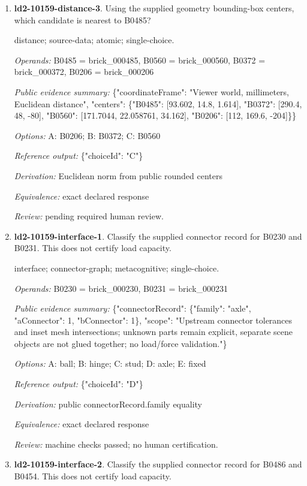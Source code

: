 \begin{enumerate}
\item \textbf{ld2-10159-distance-3}. Using the supplied geometry bounding-box centers, which candidate is nearest to B0485?
\par{\small distance; source-data; atomic; single-choice.\par\textit{Operands:} B0485 = brick\_000485, B0560 = brick\_000560, B0372 = brick\_000372, B0206 = brick\_000206\par\textit{Public evidence summary:} \{"coordinateFrame": "Viewer world, millimeters, Euclidean distance", "centers": \{"B0485": [93.602, 14.8, 1.614], "B0372": [290.4, 48, -80], "B0560": [171.7044, 22.058761, 34.162], "B0206": [112, 169.6, -204]\}\}\par\textit{Options:} A: B0206; B: B0372; C: B0560\par\textit{Reference output:} \{"choiceId": "C"\}\par\textit{Derivation:} Euclidean norm from public rounded centers\par\textit{Equivalence:} exact declared response\par\textit{Review:} pending required human review.}
\item \textbf{ld2-10159-interface-1}. Classify the supplied connector record for B0230 and B0231. This does not certify load capacity.
\par{\small interface; connector-graph; metacognitive; single-choice.\par\textit{Operands:} B0230 = brick\_000230, B0231 = brick\_000231\par\textit{Public evidence summary:} \{"connectorRecord": \{"family": "axle", "aConnector": 1, "bConnector": 1\}, "scope": "Upstream connector tolerances and inset mesh intersections; unknown parts remain explicit, separate scene objects are not glued together; no load/force validation."\}\par\textit{Options:} A: ball; B: hinge; C: stud; D: axle; E: fixed\par\textit{Reference output:} \{"choiceId": "D"\}\par\textit{Derivation:} public connectorRecord.family equality\par\textit{Equivalence:} exact declared response\par\textit{Review:} machine checks passed; no human certification.}
\item \textbf{ld2-10159-interface-2}. Classify the supplied connector record for B0486 and B0454. This does not certify load capacity.

\end{enumerate}
